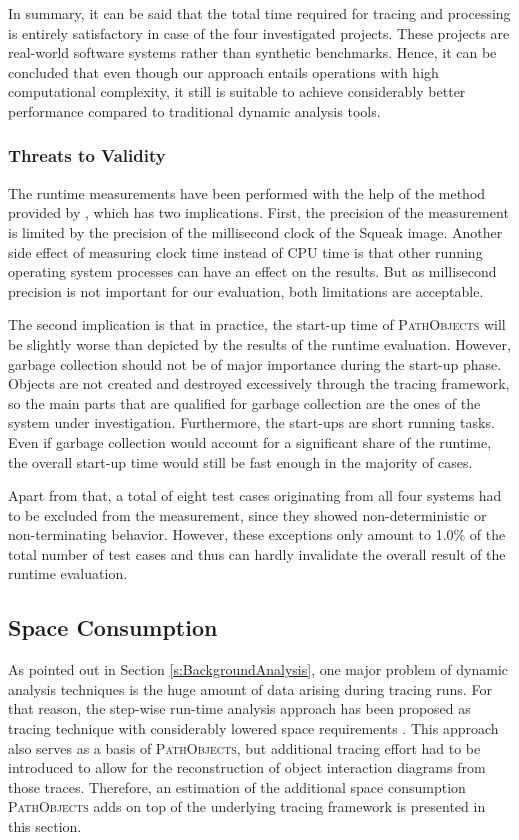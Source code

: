 In summary, it can be said that the total time required for tracing and processing is entirely satisfactory in case of the four investigated projects.
These projects are real-world software systems rather than synthetic benchmarks.
Hence, it can be concluded that even though our approach entails operations with high computational complexity, it still is suitable to achieve considerably better performance compared to traditional dynamic analysis tools.

\subsubsection{Threats to Validity}
The runtime measurements have been performed with the help of the  method provided by , which has two implications.
First, the precision of the measurement is limited by the precision of the millisecond clock of the Squeak image.
Another side effect of measuring clock time instead of CPU time is that other running operating system processes can have an effect on the results.
But as millisecond precision is not important for our evaluation, both limitations are acceptable.

The second implication is that in practice, the start-up time of \textsc{PathObjects} will be slightly worse than depicted by the results of the runtime evaluation.
However, garbage collection should not be of major importance during the start-up phase.
Objects are not created and destroyed excessively through the tracing framework, so the main parts that are qualified for garbage collection are the ones of the system under investigation.
Furthermore, the start-ups are short running tasks.
Even if garbage collection would account for a significant share of the runtime, the overall start-up time would still be fast enough in the majority of cases.

Apart from that, a total of eight test cases originating from all four systems had to be excluded from the measurement, since they showed non-deterministic or non-terminating behavior.
However, these exceptions only amount to 1.0\% of the total number of test cases and thus can hardly invalidate the overall result of the runtime evaluation.

\subsection{Space Consumption}
\label{ss:DiscussionSpace}
As pointed out in Section \ref{s:BackgroundAnalysis}, one major problem of dynamic analysis techniques is the huge amount of data arising during tracing runs.
For that reason, the step-wise run-time analysis approach has been proposed as tracing technique with considerably lowered space requirements \cite{perscheid_immediacy_2010}. 
This approach also serves as a basis of \textsc{PathObjects}, but additional tracing effort had to be introduced to allow for the reconstruction of object interaction diagrams from those traces.
Therefore, an estimation of the additional space consumption \textsc{PathObjects} adds on top of the underlying tracing framework is presented in this section.

